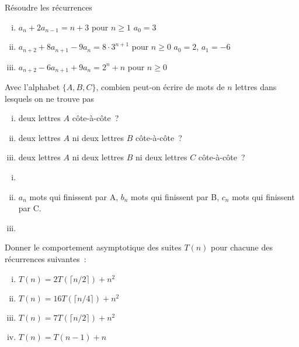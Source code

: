 
\begin{exo}
R\'esoudre les r\'ecurrences
%
\begin{enumerate}[(i)]
\item $a_n + 2 a_{n-1} = n+3$ pour $n \geqslant 1$\hfill
      $a_0 = 3$
      
\item $a_{n+2} + 8 a_{n+1} - 9 a_{n} = 8 \cdot 3^{n+1}$ pour $n \geqslant 0$\hfill
      $a_0 = 2$, \quad $a_1 = -6$
      
\item $a_{n+2} - 6 a_{n+1} + 9 a_{n} = 2^n + n$ pour $n \geqslant 0$

\end{enumerate}
\end{exo}


\begin{exo}
Avec l'alphabet $\{A,B,C\}$, combien peut-on \'ecrire de mots de $n$ lettres dans lesquels on ne trouve pas
%
\begin{enumerate}[(i)]
\item deux lettres $A$ c\^ote-\`a-c\^ote~?
\item deux lettres $A$ ni deux lettres $B$ c\^ote-\`a-c\^ote~?
\item deux lettres $A$ ni deux lettres $B$ ni deux lettres $C$ c\^ote-\`a-c\^ote~?
\end{enumerate}
\end{exo}

\begin{enumerate}[(i)]
\item

\item $a_n$ mots qui finissent par A, $b_n$ mots qui finissent par B, $c_n$ mots qui finissent par C.

\item 
\end{enumerate}


\begin{exo}
Donner le comportement asymptotique des suites $T(n)$ pour chacune des r\'ecurrences suivantes~:
%
\begin{enumerate}[(i)]
\item $T(n) = 2T(\lceil n/2 \rceil) + n^2$
\item $T(n) = 16T(\lceil n/4 \rceil) + n^2$
\item $T(n) = 7 T(\lceil n/2 \rceil) + n^2$
\item $T(n) = T(n-1) + n$
\end{enumerate}
\end{exo}

